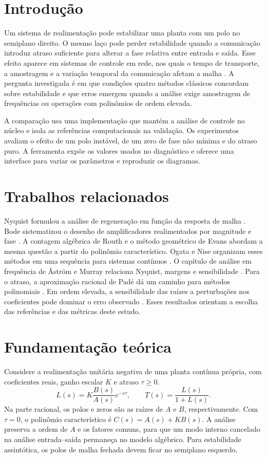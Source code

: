 \section{Introdução}
Um sistema de realimentação pode estabilizar uma planta com um polo no
semiplano direito. O mesmo laço pode perder estabilidade quando a comunicação
introduz atraso suficiente para alterar a fase relativa entre entrada e
saída. Esse efeito aparece em sistemas de controle em rede, nos quais o
tempo de transporte, a amostragem e a variação temporal da comunicação
afetam a malha \cite{zhang2001}. A pergunta investigada é em que condições
quatro métodos clássicos concordam sobre estabilidade e que erros emergem
quando a análise exige amostragem de frequências ou operações com
polinômios de ordem elevada.

A comparação usa uma implementação que mantém a análise de controle no
núcleo e isola as referências computacionais na validação. Os experimentos
avaliam o efeito de um polo instável, de um zero de fase não mínima e do
atraso puro. A ferramenta expõe os valores usados no diagnóstico e oferece
uma interface para variar os parâmetros e reproduzir os diagramas.

\section{Trabalhos relacionados}
Nyquist formulou a análise de regeneração em função da resposta de malha
\cite{nyquist1932}. Bode sistematizou o desenho de amplificadores realimentados
por magnitude e fase \cite{bode1945}. A contagem algébrica de Routh
\cite{routh1877} e o método geométrico de Evans \cite{evans1950} abordam a
mesma questão a partir do polinômio característico. Ogata e Nise organizam
esses métodos em uma sequência para sistemas contínuos
\cite{ogata2010,nise2017}. O capítulo de análise em frequência de Åström e
Murray relaciona Nyquist, margens e sensibilidade \cite{astrom2008}.
Para o atraso, a aproximação racional de Padé dá um caminho para métodos
polinomiais \cite{baker1996}. Em ordem elevada, a sensibilidade das raízes
a perturbações nos coeficientes pode dominar o erro observado
\cite{wilkinson1959}. Esses resultados orientam a escolha das referências
e das métricas deste estudo.

\section{Fundamentação teórica}
Considere a realimentação unitária negativa de uma planta contínua própria,
com coeficientes reais, ganho escalar $K$ e atraso $\tau\ge 0$.
\begin{equation}
L(s)=K\frac{B(s)}{A(s)}e^{-s\tau},\qquad
T(s)=\frac{L(s)}{1+L(s)} .
\label{eq:loop}
\end{equation}
Na parte racional, os polos e zeros são as raízes de $A$ e $B$,
respectivamente. Com $\tau=0$, o polinômio característico é
$C(s)=A(s)+KB(s)$. A análise preserva a ordem de $A$ e os fatores comuns,
para que um modo interno cancelado na análise entrada--saída permaneça
no modelo algébrico. Para estabilidade assintótica, os polos de malha
fechada devem ficar no semiplano esquerdo.

